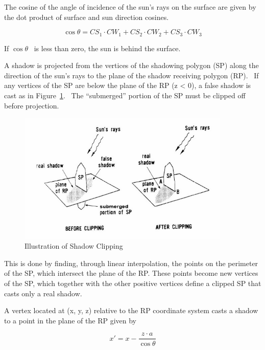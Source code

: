 The cosine of the angle of incidence of the sun's rays on the surface are given by the dot product of surface and sun direction cosines.

\begin{equation}
\cos \theta  = C{S_1}\cdot C{W_1} + C{S_2}\cdot C{W_2} + C{S_3}\cdot C{W_3}
\end{equation}

If \(\cos \theta\) ~is less than zero, the sun is behind the surface.

A shadow is projected from the vertices of the shadowing polygon (SP) along the direction of the sun's rays to the plane of the shadow receiving polygon (RP).~ If any vertices of the SP are below the plane of the RP (z \textless{} 0), a false shadow is cast as in Figure~\ref{fig:illustration-of-shadow-clipping}.~ The ``submerged'' portion of the SP must be clipped off before projection.

\begin{figure}[hbtp] %
\centering
\includegraphics[width=0.9\textwidth, height=0.9\textheight, keepaspectratio=true]{media/image628.png}
\caption{Illustration of Shadow Clipping \protect \label{fig:illustration-of-shadow-clipping}}
\end{figure}

This is done by finding, through linear interpolation, the points on the perimeter of the SP, which intersect the plane of the RP. These points become new vertices of the SP, which together with the other positive vertices define a clipped SP that casts only a real shadow.

A vertex located at (x, y, z) relative to the RP coordinate system casts a shadow to a point in the plane of the RP given by

\begin{equation}
{x'} = x - \frac{{z\cdot a}}{{\cos \theta }}
\end{equation}


